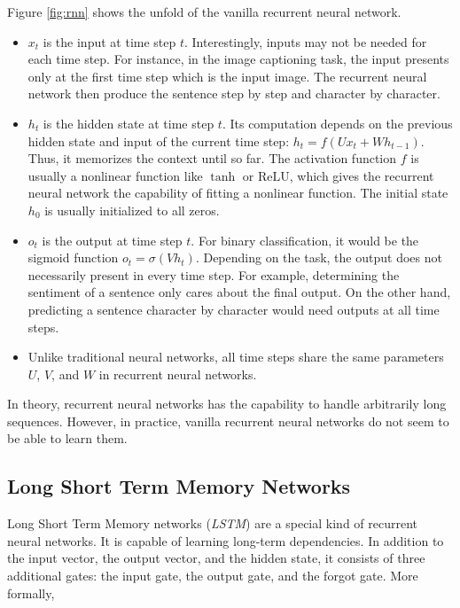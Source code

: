         Figure \ref{fig:rnn} shows the unfold of the vanilla recurrent neural network.

        \begin{itemize}
            \item $x_t$ is the input at time step $t$.
                Interestingly, inputs may not be needed for each time step.
                For instance, in the image captioning task,
                the input presents only at the first time step which is the input image.
                The recurrent neural network then produce the sentence step by step and character by character.
            \item $h_t$ is the hidden state at time step $t$.
                Its computation depends on the previous hidden state and input of the current time step:
                $h_t = f(Ux_t + Wh_{t-1})$.
                Thus, it memorizes the context until so far.
                The activation function $f$ is usually a nonlinear function like $\tanh$ or $\mathrm{ReLU}$,
                which gives the recurrent neural network the capability of fitting a nonlinear function.
                The initial state $h_0$ is usually initialized to all zeros.
            \item $o_t$ is the output at time step $t$.
                For binary classification, it would be the sigmoid function $o_t = \sigma(Vh_t)$.
                Depending on the task, the output does not necessarily present in every time step.
                For example, determining the sentiment of a sentence only cares about the final output.
                On the other hand, predicting a sentence character by character would need outputs at all time steps.
            \item Unlike traditional neural networks,
                all time steps share the same parameters $U$, $V$, and $W$ in recurrent neural networks.
        \end{itemize}

        In theory, recurrent neural networks has the capability to handle arbitrarily long sequences.
        However, in practice, vanilla recurrent neural networks do not seem to be able to learn them.
        \cite{Pascanu2013}

    \subsection{Long Short Term Memory Networks}

        Long Short Term Memory networks (\emph{LSTM}) are a special kind of recurrent neural networks.
        It is capable of learning long-term dependencies.
        In addition to the input vector, the output vector, and the hidden state,
        it consists of three additional gates: the input gate, the output gate, and the forgot gate.
        More formally,

